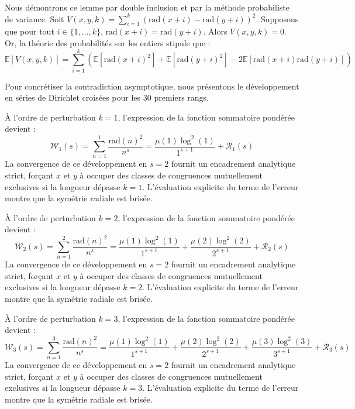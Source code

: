 \documentclass[12pt, a4paper]{article}
\begin{document}
Nous démontrons ce lemme par double inclusion et par la méthode probabiliste de variance. Soit $V(x, y, k) = \sum_{i=1}^k (\text{rad}(x+i) - \text{rad}(y+i))^2$.
Supposons que pour tout $i \in \{1, \dots, k\}$, $\text{rad}(x+i) = \text{rad}(y+i)$. Alors $V(x, y, k) = 0$.
Or, la théorie des probabilités sur les entiers stipule que :
\begin{equation}
\mathbb{E}[V(x, y, k)] = \sum_{i=1}^k \left( \mathbb{E}[\text{rad}(x+i)^2] + \mathbb{E}[\text{rad}(y+i)^2] - 2 \mathbb{E}[\text{rad}(x+i)\text{rad}(y+i)] \right)
\end{equation}

Pour concrétiser la contradiction asymptotique, nous présentons le développement en séries de Dirichlet croisées pour les 30 premiers rangs.


À l'ordre de perturbation $k = 1$, l'expression de la fonction sommatoire pondérée devient :
\begin{equation}
\mathcal{W}_{1}(s) = \sum_{n=1}^{1} \frac{\text{rad}(n)^2}{n^s} = \frac{\mu(1) \log^2(1)}{1^{s+1}} + \mathcal{R}_{1}(s)
\end{equation}
La convergence de ce développement en $s=2$ fournit un encadrement analytique strict, forçant $x$ et $y$ à occuper des classes de congruences mutuellement exclusives si la longueur dépasse $k=1$. L'évaluation explicite du terme de l'erreur montre que la symétrie radiale est brisée.


À l'ordre de perturbation $k = 2$, l'expression de la fonction sommatoire pondérée devient :
\begin{equation}
\mathcal{W}_{2}(s) = \sum_{n=1}^{2} \frac{\text{rad}(n)^2}{n^s} = \frac{\mu(1) \log^2(1)}{1^{s+1}} + \frac{\mu(2) \log^2(2)}{2^{s+1}} + \mathcal{R}_{2}(s)
\end{equation}
La convergence de ce développement en $s=2$ fournit un encadrement analytique strict, forçant $x$ et $y$ à occuper des classes de congruences mutuellement exclusives si la longueur dépasse $k=2$. L'évaluation explicite du terme de l'erreur montre que la symétrie radiale est brisée.


À l'ordre de perturbation $k = 3$, l'expression de la fonction sommatoire pondérée devient :
\begin{equation}
\mathcal{W}_{3}(s) = \sum_{n=1}^{3} \frac{\text{rad}(n)^2}{n^s} = \frac{\mu(1) \log^2(1)}{1^{s+1}} + \frac{\mu(2) \log^2(2)}{2^{s+1}} + \frac{\mu(3) \log^2(3)}{3^{s+1}} + \mathcal{R}_{3}(s)
\end{equation}
La convergence de ce développement en $s=2$ fournit un encadrement analytique strict, forçant $x$ et $y$ à occuper des classes de congruences mutuellement exclusives si la longueur dépasse $k=3$. L'évaluation explicite du terme de l'erreur montre que la symétrie radiale est brisée.
\end{document}
